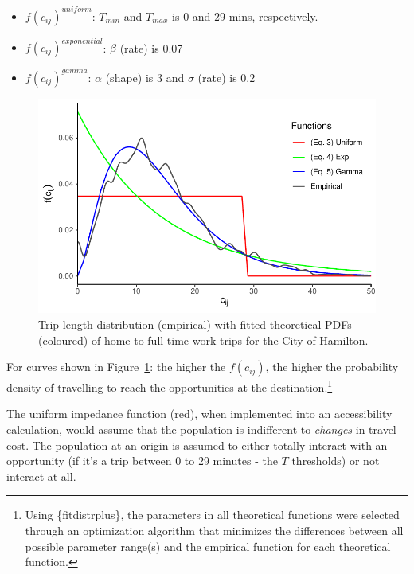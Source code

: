 \documentclass[12pt, oneside]{report}
\begin{document}
\begin{itemize}
\item
  \(f(c_{ij})^{uniform}\): \(T_{min}\) and \(T_{max}\) is 0 and 29 mins,
  respectively.
\item
  \(f(c_{ij})^{exponential}\): \(\beta\) (rate) is 0.07
\item
  \(f(c_{ij})^{gamma}\): \(\alpha\) (shape) is 3 and \(\sigma\) (rate)
  is 0.2
\end{itemize}

\begin{figure}

{\centering \includegraphics{tools-report_files/figure-pdf/fig-TLD-all-1.pdf}

}

\caption{\label{fig-TLD-all}Trip length distribution (empirical) with
fitted theoretical PDFs (coloured) of home to full-time work trips for
the City of Hamilton.}

\end{figure}

For curves shown in Figure~\ref{fig-TLD-all}: the higher the
\(f(c_{ij})\), the higher the probability density of travelling to reach
the opportunities at the destination.\footnote{Using \{fitdistrplus\},
  the parameters in all theoretical functions were selected through an
  optimization algorithm that minimizes the differences between all
  possible parameter range(s) and the empirical function for each
  theoretical function.}

The uniform impedance function (red), when implemented into an
accessibility calculation, would assume that the population is
indifferent to \emph{changes} in travel cost. The population at an
origin is assumed to either totally interact with an opportunity (if
it's a trip between 0 to 29 minutes - the \(T\) thresholds) or not
interact at all.
\end{document}
